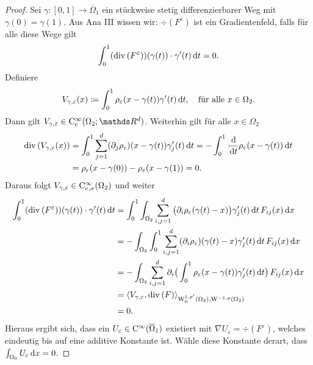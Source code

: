 \begin{proof}
  Sei $\gamma \colon [0,1] \to \overline\Omega_1$ ein stückweise stetig differenzierbarer Weg mit $\gamma(0) = \gamma(1)$.
  Aus Ana III wissen wir: $\div(F^\varepsilon)$ ist ein Gradientenfeld, falls für alle diese Wege gilt
  $$
  \int_0^1 (\mathrm{div\,} (F^\varepsilon))(\gamma(t))\cdot \gamma'(t) \, {\operatorname{d}\!{t}} = 0.
  $$
  Definiere 
  $$
  V_{\gamma,\varepsilon}(x) \coloneqq \int_0^1 \rho_\varepsilon(x - \gamma(t))\gamma'(t) \, {\operatorname{d}\!{t}}, \quad\text{für alle } x \in \Omega_2.
  $$
  Dann gilt $V_{\gamma,\varepsilon} \in \CC_{\cc}^\infty(\Omega_2; \R^d)$.
  Weiterhin gilt für alle $x \in \Omega_2$
  \begin{align*}
    \mathrm{div\,} (V_{\gamma,\varepsilon}(x))
    &= \int_0^1 \sum_{j = 1}^d (\partial_j \rho_\varepsilon)(x - \gamma(t)) \gamma_j'(t) \, {\operatorname{d}\!{t}}
    = - \int_0^1 \frac{\, {\operatorname{d}\!{}} }{\, {\operatorname{d}\!{t}}} \rho_\varepsilon(x - \gamma(t)) \, {\operatorname{d}\!{t}} \\
    &= \rho_\varepsilon(x - \gamma(0)) - \rho_\varepsilon(x - \gamma(1))
    = 0.
  \end{align*}
  Daraus folgt $V_{\gamma,\varepsilon} \in \mathrm{C}_{\mathrm{c}, \sigma}^\infty(\Omega_2)$ und weiter
  \begin{align*}
    \int_0^1(\mathrm{div\,} (F^\varepsilon))(\gamma(t)) \cdot \gamma'(t) \, {\operatorname{d}\!{t}}
    &= \int_0^1 \int_{\Omega_2} \sum_{i,j = 1}^d \big(\partial_i \rho_\varepsilon(\gamma(t) - x)\big) \gamma_j'(t) \, {\operatorname{d}\!{t}} \, F_{ij}(x)  \, {\operatorname{d}\!{x}} \\
    &= -\int_{\Omega_2} \int_0^1 \sum_{i,j = 1}^d (\partial_i \rho_\varepsilon) (\gamma(t) - x) \gamma_j'(t) \, {\operatorname{d}\!{t}} \, F_{ij}(x) \, {\operatorname{d}\!{x}} \\
    &= -\int_{\Omega_2} \sum_{i,j=1}^d \partial_i\big(  \int_0^1 \rho_\varepsilon(x - \gamma(t)) \gamma_j'(t) \, {\operatorname{d}\!{t}} \big) \, F_{ij}(x) \, {\operatorname{d}\!{x}} \\
    &= \langle V_{\gamma,\varepsilon}, \mathrm{div\,} (F) \rangle_{\mathrm{W}_0^{1,p'}(\Omega_2), \mathrm{W}^{-1,p}(\Omega_2)} \\
    &= 0.
  \end{align*}
  Hieraus ergibt sich, dass ein $U_\varepsilon \in \mathrm{C}^\infty(\overline\Omega_1)$ existiert mit $\nabla U_\varepsilon = \div(F^\varepsilon)$, welches eindeutig bis auf eine additive Konstante ist.
  Wähle diese Konstante derart, dass $\int_{\Omega_0} U_\varepsilon \, {\operatorname{d}\!{x}} = 0$.


\end{proof}
